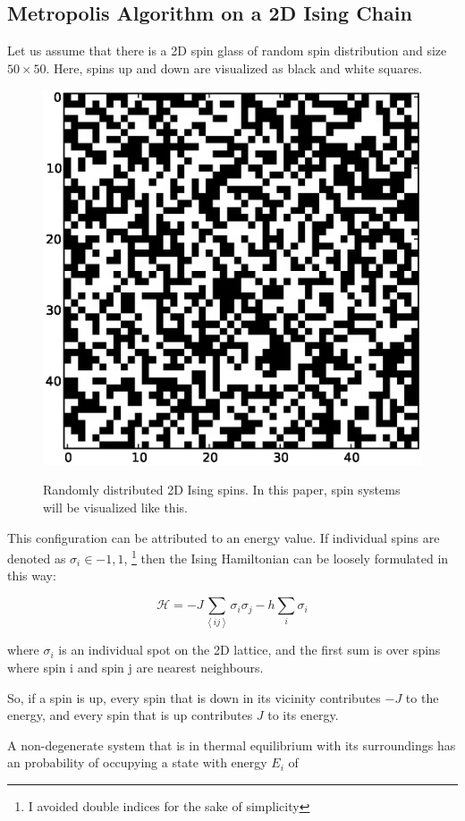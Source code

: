 \subsection{Metropolis Algorithm on a 2D Ising Chain}

Let us assume that there is a 2D spin glass of random spin distribution and size $ 50\times 50 $. Here, spins up and down are visualized as black and white squares.

	\begin{figure}[H]
	\center
	\includegraphics[width=0.5\linewidth]{fig/spins.eps}
	\label{fig:spins}
	\caption[Randomly distributed 2D Ising spins]{Randomly distributed 2D  Ising spins. In this paper, spin systems will be visualized like this.}
	\end{figure}
	
This configuration can be attributed to an energy value. If individual spins are denoted as $ \sigma_{i} \in {-1,1} $, \footnote{I avoided double indices for the sake of simplicity} then the Ising Hamiltonian can be loosely formulated in this way:

\begin{equation}
\label{eq:hamiltonian}
\mathcal{H} = - J \sum\limits_{\left\langle ij \right\rangle} \sigma_{i} \sigma_{j} -h \sum\limits_{i}\sigma_{i}
\end{equation}
	
where $ \sigma_{i}$ is an individual spot on the 2D lattice, and the first sum is over spins where spin i and spin j are nearest neighbours. 

So, if a spin is up, every spin that is down in its vicinity contributes $ -J $ to the energy, and every spin that is up contributes $ J $ to its energy.  

A non-degenerate system that is in thermal equilibrium with its surroundings has an probability of occupying a state with energy $ E_i $ of

